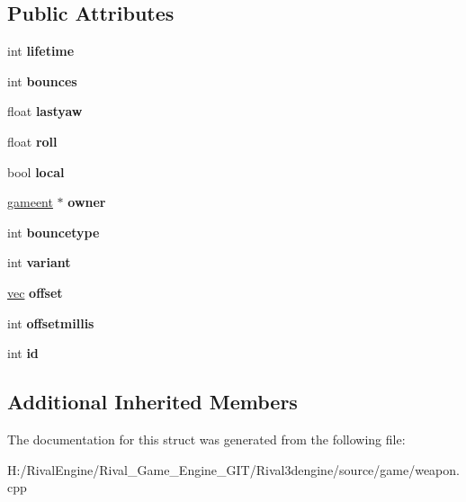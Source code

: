 \subsection*{Public Attributes}
\begin{DoxyCompactItemize}
\item 
\mbox{\label{structgame_1_1bouncer_a2cc7b6b0e1a877ca0b5fc7917365b5e5}} 
int {\bfseries lifetime}
\item 
\mbox{\label{structgame_1_1bouncer_acc4edbfc630e3b759833a681d15e4158}} 
int {\bfseries bounces}
\item 
\mbox{\label{structgame_1_1bouncer_a96426e908a0652f26138a7473084cf40}} 
float {\bfseries lastyaw}
\item 
\mbox{\label{structgame_1_1bouncer_a685cf2280b33854ff1fa0a889386aac0}} 
float {\bfseries roll}
\item 
\mbox{\label{structgame_1_1bouncer_abc485f2956f52f71489ddd68adf80958}} 
bool {\bfseries local}
\item 
\mbox{\label{structgame_1_1bouncer_a4b5ed8a47df43ea3f017ed2a85556a83}} 
\hyperlink{structgameent}{gameent} $\ast$ {\bfseries owner}
\item 
\mbox{\label{structgame_1_1bouncer_a78ca5444a43487d89ed30cbbbc15b959}} 
int {\bfseries bouncetype}
\item 
\mbox{\label{structgame_1_1bouncer_a852f0a903ee4275a06dfc32dddb6c63d}} 
int {\bfseries variant}
\item 
\mbox{\label{structgame_1_1bouncer_a94679393bacdf83bf64b7f8082854e74}} 
\hyperlink{structvec}{vec} {\bfseries offset}
\item 
\mbox{\label{structgame_1_1bouncer_a4636f6072f94538d29ef1d16d4f60765}} 
int {\bfseries offsetmillis}
\item 
\mbox{\label{structgame_1_1bouncer_a6960ae69f49b7a491b891668ce8d57fc}} 
int {\bfseries id}
\end{DoxyCompactItemize}
\subsection*{Additional Inherited Members}


The documentation for this struct was generated from the following file\+:\begin{DoxyCompactItemize}
\item 
H\+:/\+Rival\+Engine/\+Rival\+\_\+\+Game\+\_\+\+Engine\+\_\+\+G\+I\+T/\+Rival3dengine/source/game/weapon.\+cpp\end{DoxyCompactItemize}
